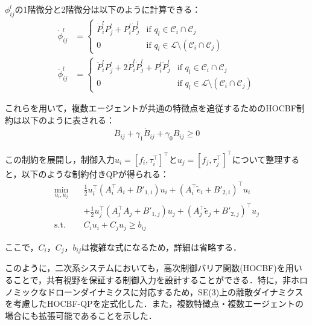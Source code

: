 $\phi_{ij}^l$の1階微分と2階微分は以下のように計算できる：
\begin{equation}
\begin{aligned}
\dot{\phi}_{ij}^l &= 
\begin{cases}
\dot{P}_i^l P_j^l + P_i^l \dot{P}_j^l & \text{if } q_l \in \mathcal{C}_i \cap \mathcal{C}_j \\
0 & \text{if } q_l \in \mathcal{L} \setminus (\mathcal{C}_i \cap \mathcal{C}_j)
\end{cases} \\
\ddot{\phi}_{ij}^l &= 
\begin{cases}
\ddot{P}_i^l P_j^l + 2 \dot{P}_i^l \dot{P}_j^l + P_i^l \ddot{P}_j^l & \text{if } q_l \in \mathcal{C}_i \cap \mathcal{C}_j \\
0 & \text{if } q_l \in \mathcal{L} \setminus (\mathcal{C}_i \cap \mathcal{C}_j)
\end{cases}
\label{eq:common_probability_derivative_hocbf}
\end{aligned}
\end{equation}

これらを用いて，複数エージェントが共通の特徴点を追従するためのHOCBF制約は以下のように表される：
\begin{equation}
\begin{aligned}
\ddot{B}_{ij} + \gamma_1 \dot{B}_{ij} + \gamma_0 B_{ij} \geq 0
\label{eq:common_hocbf_constraint}
\end{aligned}
\end{equation}

この制約を展開し，制御入力$u_i = [f_i, \tau_i^\top]^\top$と$u_j = [f_j, \tau_j^\top]^\top$について整理すると，以下のような制約付きQPが得られる：
\begin{equation}
\begin{aligned}
\min_{u_i, u_j} \quad & \frac{1}{2} u_i^\top (A_i^\top A_i + B'_{1,i}) u_i + (A_i^\top \tilde{e}_i + B'_{2,i})^\top u_i \\
&+ \frac{1}{2} u_j^\top (A_j^\top A_j + B'_{1,j}) u_j + (A_j^\top \tilde{e}_j + B'_{2,j})^\top u_j \\
\mathrm{s.t.} \quad & C_i u_i + C_j u_j \geq b_{ij}
\label{eq:common_hocbf_qp}
\end{aligned}
\end{equation}

ここで，$C_i$，$C_j$，$b_{ij}$は複雑な式になるため，詳細は省略する．

このように，二次系システムにおいても，高次制御バリア関数(HOCBF)を用いることで，共有視野を保証する制御入力を設計することができる．特に，非ホロノミックなドローンダイナミクスに対応するため，SE(3)上の離散ダイナミクスを考慮したHOCBF-QPを定式化した．また，複数特徴点・複数エージェントの場合にも拡張可能であることを示した．

